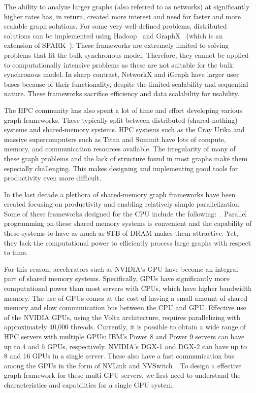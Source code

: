 The ability to analyze larger graphs (also referred to as networks) at significantly higher rates has, in return, created more interest and need for faster and more scalable graph solutions. For some very well-defined problems, distributed solutions can be implemented using Hadoop~\cite{White:2009:HDG:1717298} and GraphX~\cite{gonzalez2014graphx} (which is an extension of SPARK~\cite{zaharia2010spark}). These frameworks are extremely limited to solving problems that fit the bulk synchronous model. Therefore, they cannot be applied to computationally intensive problems as these are not suitable for the bulk synchronous model. In sharp contrast, NetworkX\cite{SciPyProceedings_11} and iGraph\cite{Han:2010:IFC:1920841.1920901} have larger user bases because of their functionality, despite the limited scalability and sequential nature. These frameworks sacrifice efficiency and data scalability for usability.

The HPC community has also spent a lot of time and effort developing various graph frameworks. These typically split between distributed (shared-nothing) systems and shared-memory systems. HPC systems such as the Cray Urika and massive supercomputers such as Titan and Summit have lots of compute, memory, and communication resources available. The irregularity of many of these graph problems and the lack of structure found in most graphs make them especially challenging. This makes designing and implementing good tools for productivity even more difficult.

In the last decade a plethora of shared-memory graph frameworks have been created focusing on productivity and enabling relatively simple parallelization. Some of these frameworks designed for the CPU include the following:~\cite{stinger-tr,shun2013ligra,beamer2015gap,pingali2011tao,Sundaram:2015:GHP:2809974.2809983}.
Parallel programming on these shared memory systems is convenient and the capability of these systems to have as much as 8TB of DRAM makes them attractive. Yet, they lack the computational power to efficiently process large graphs with respect to time.

For this reason, accelerators such as NVIDIA's GPU have become an integral part of shared memory systems. Specifically, GPUs have significantly more computational power than most servers with CPUs, which have higher bandwidth memory. The use of GPUs comes at the cost of having a small amount of shared memory and slow communication bus between the CPU and GPU. Effective use of the NVIDIA GPUs, using the Volta architecture, requires parallelizing with approximately 40,000 threads.
Currently, it is possible to obtain a wide range of HPC servers with multiple GPUs: IBM's Power 8 and Power 9 servers can have up to 4 and 6 GPUs, respectively. NVIDIA's DGX-1 and DGX-2 can have up to 8 and 16 GPUs in a single server. These also have a fast communication bus among the GPUs in the form of NVLink and NVSwitch~\cite{foley2017ultra}.
To design a effective graph framework for these multi-GPU servers, we first need to understand the characteristics and capabilities for a single GPU system.

